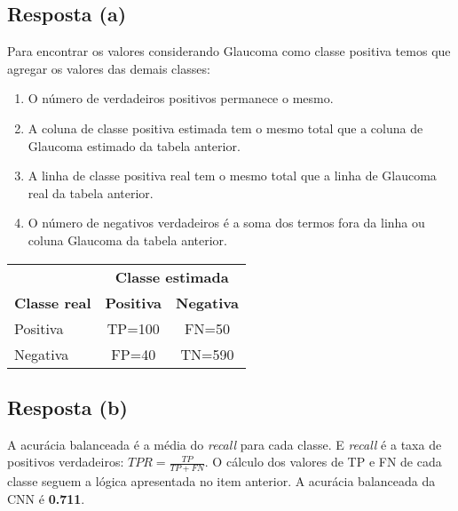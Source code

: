 \documentclass[final,3p]{elsarticle}
\numberwithin{equation}{section}
\begin{document}
    \subsection{Resposta \textbf{(a)}}

        Para encontrar os valores considerando Glaucoma como classe positiva temos que agregar os valores das demais classes:

        \begin{enumerate}
            \item O número de verdadeiros positivos permanece o mesmo.
            \item A coluna de classe positiva estimada tem o mesmo total que a coluna de Glaucoma estimado da tabela anterior.
            \item A linha de classe positiva real tem o mesmo total que a linha de Glaucoma real da tabela anterior.
            \item O número de negativos verdadeiros é a soma dos termos fora da linha ou coluna Glaucoma da tabela anterior.
        \end{enumerate}

        \begin{table}[H]
            \centering
            \begin{tabular}{l c c}
                \toprule
                & \multicolumn{2}{c}{\textbf{Classe estimada}} \\
                \textbf{Classe real} & \textbf{Positiva} & \textbf{Negativa} \\
                \midrule
                Positiva & TP=100 & FN=50 \\
                Negativa & FP=40 & TN=590 \\
                \bottomrule
            \end{tabular}
        \end{table}

    \subsection{Resposta \textbf{(b)}}

        A acurácia balanceada é a média do \emph{recall} para cada classe. E \emph{recall} é a taxa de positivos verdadeiros: $TPR = \frac{TP}{TP+FN}$. O cálculo dos valores de TP e FN de cada classe seguem a lógica apresentada no item anterior. A acurácia balanceada da CNN é \textbf{0.711}.
\end{document}
